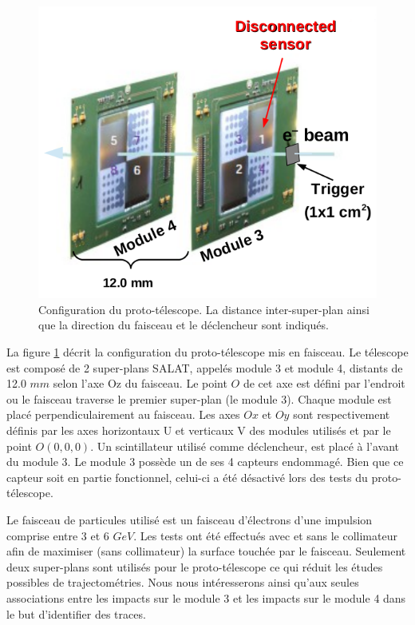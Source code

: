    \begin{figure}[!htb]
    \begin{center} 
      \includegraphics[scale=0.50]{./figures/SALAT_beam_test/config_proto_tel.png}
      \caption{Configuration du proto-t\'elescope. La distance inter-super-plan ainsi que la direction du faisceau et le d\'eclencheur sont indiqu\'es.}
      \label{fig:SALAT_proto_tel}
    \end{center}
   \end{figure}    
  
  \medskip
  
  La figure \ref{fig:SALAT_proto_tel} d\'ecrit la configuration du proto-t\'elescope mis en faisceau. Le t\'elescope est compos\'e de 2 super-plans SALAT, appel\'es module 3 et module 4, distants de 12.0 $mm$ selon l'axe Oz du faisceau. Le point $O$ de cet axe est d\'efini par l'endroit ou le faisceau traverse le premier super-plan (le module 3). Chaque module est plac\'e perpendiculairement au faisceau. Les axes $Ox$ et $Oy$ sont respectivement d\'efinis par les axes horizontaux U et verticaux V des modules utilis\'es et par le point $O(0,0,0)$. Un scintillateur utilis\'e comme d\'eclencheur, est plac\'e \`a l'avant du module 3. Le module 3 poss\`ede un de ses 4 capteurs endommag\'e. Bien que ce capteur soit en partie fonctionnel, celui-ci a \'et\'e d\'esactiv\'e lors des tests du proto-t\'elescope.
  
  \medskip
  
  Le faisceau de particules utilis\'e est un faisceau d'\'electrons d'une impulsion comprise entre 3 et 6 $GeV$. Les tests ont \'et\'e effectu\'es avec et sans le collimateur afin de maximiser (sans collimateur) la surface touch\'ee par le faisceau. Seulement deux super-plans sont utilis\'es pour le proto-t\'elescope ce qui r\'eduit les \'etudes possibles de trajectom\'etries. Nous nous int\'eresserons ainsi qu'aux seules associations entre les impacts sur le module 3 et les impacts sur le module 4 dans le but d'identifier des traces.
  
